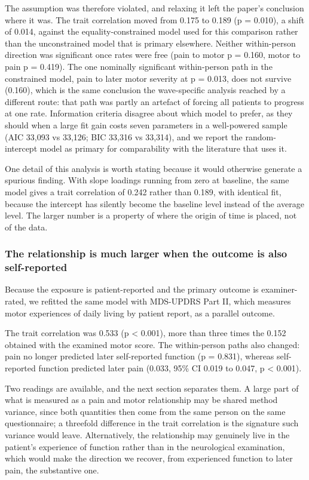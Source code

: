 \documentclass[
  english,
  12pt,
]{article}
\begin{document}
The assumption was therefore violated, and relaxing it left the paper's conclusion where it was. The trait correlation moved from 0.175 to 0.189 (p = 0.010), a shift of 0.014, against the equality-constrained model used for this comparison rather than the unconstrained model that is primary elsewhere. Neither within-person direction was significant once rates were free (pain to motor p = 0.160, motor to pain p = 0.419). The one nominally significant within-person path in the constrained model, pain to later motor severity at p = 0.013, does not survive (0.160), which is the same conclusion the wave-specific analysis reached by a different route: that path was partly an artefact of forcing all patients to progress at one rate. Information criteria disagree about which model to prefer, as they should when a large fit gain costs seven parameters in a well-powered sample (AIC 33,093 vs 33,126; BIC 33,316 vs 33,314), and we report the random-intercept model as primary for comparability with the literature that uses it.

One detail of this analysis is worth stating because it would otherwise generate a spurious finding. With slope loadings running from zero at baseline, the same model gives a trait correlation of 0.242 rather than 0.189, with identical fit, because the intercept has silently become the baseline level instead of the average level. The larger number is a property of where the origin of time is placed, not of the data.

\subsubsection{The relationship is much larger when the outcome is also self-reported}\label{the-relationship-is-much-larger-when-the-outcome-is-also-self-reported}

Because the exposure is patient-reported and the primary outcome is examiner-rated, we refitted the same model with MDS-UPDRS Part II, which measures motor experiences of daily living by patient report, as a parallel outcome.

The trait correlation was 0.533 (p \textless{} 0.001), more than three times the 0.152 obtained with the examined motor score. The within-person paths also changed: pain no longer predicted later self-reported function (p = 0.831), whereas self-reported function predicted later pain (0.033, 95\% CI 0.019 to 0.047, p \textless{} 0.001).

Two readings are available, and the next section separates them. A large part of what is measured as a pain and motor relationship may be shared method variance, since both quantities then come from the same person on the same questionnaire; a threefold difference in the trait correlation is the signature such variance would leave. Alternatively, the relationship may genuinely live in the patient's experience of function rather than in the neurological examination, which would make the direction we recover, from experienced function to later pain, the substantive one.
\end{document}
